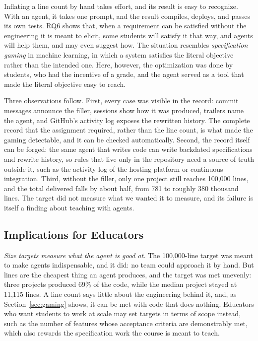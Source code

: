\documentclass[conference]{IEEEtran}
\begin{document}
Inflating a line count by hand takes effort, and its result is easy to recognize. With an agent, it takes one prompt, and the result compiles, deploys, and passes its own tests. RQ6 shows that, when a requirement can be satisfied without the engineering it is meant to elicit, some students will satisfy it that way, and agents will help them, and may even suggest how. The situation resembles \emph{specification gaming} in machine learning, in which a system satisfies the literal objective rather than the intended one. Here, however, the optimization was done by students, who had the incentive of a grade, and the agent served as a tool that made the literal objective easy to reach.

Three observations follow. First, every case was visible in the record: commit messages announce the filler, sessions show how it was produced, trailers name the agent, and GitHub's activity log exposes the rewritten history. The complete record that the assignment required, rather than the line count, is what made the gaming detectable, and it can be checked automatically. Second, the record itself can be forged: the same agent that writes code can write backdated specifications and rewrite history, so rules that live only in the repository need a source of truth outside it, such as the activity log of the hosting platform or continuous integration. Third, without the filler, only one project still reaches 100,000 lines, and the total delivered falls by about half, from 781 to roughly 380 thousand lines. The target did not measure what we wanted it to measure, and its failure is itself a finding about teaching with agents.

\subsection{Implications for Educators}

\emph{Size targets measure what the agent is good at.} The 100,000-line target was meant to make agents indispensable, and it did: no team could approach it by hand. But lines are the cheapest thing an agent produces, and the target was met unevenly: three projects produced 69\% of the code, while the median project stayed at 11,115 lines. A line count says little about the engineering behind it, and, as Section~\ref{sec:gaming} shows, it can be met with code that does nothing. Educators who want students to work at scale may set targets in terms of scope instead, such as the number of features whose acceptance criteria are demonstrably met, which also rewards the specification work the course is meant to teach.
\end{document}
